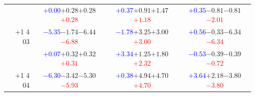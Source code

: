 \documentclass[compress]{beamer}
\begin{document}
\begin{frame}
\begin{tabular}{r | c | c | c}
          & \textcolor{blue}{$+0.00$}\hspace{0.1 cm}$+0.28$\hspace{0.1 cm}$+0.28$\hspace{0.1 cm}\textcolor{red}{$+0.28$} & \textcolor{blue}{$+0.37$}\hspace{0.1 cm}$+0.91$\hspace{0.1 cm}$+1.47$\hspace{0.1 cm}\textcolor{red}{$+1.18$} & \textcolor{blue}{$+0.35$}\hspace{0.1 cm}$-0.81$\hspace{0.1 cm}$-0.81$\hspace{0.1 cm}\textcolor{red}{$-2.01$} \\
$+$1 4 03 & \textcolor{blue}{$-5.35$}\hspace{0.1 cm}$-1.74$\hspace{0.1 cm}$-6.44$\hspace{0.1 cm}\textcolor{red}{$-6.88$} & \textcolor{blue}{$-1.78$}\hspace{0.1 cm}$+3.25$\hspace{0.1 cm}$+3.00$\hspace{0.1 cm}\textcolor{red}{$+3.00$} & \textcolor{blue}{$+0.56$}\hspace{0.1 cm}$-0.33$\hspace{0.1 cm}$-6.34$\hspace{0.1 cm}\textcolor{red}{$-6.34$} \\
          & \textcolor{blue}{$+0.07$}\hspace{0.1 cm}$+0.32$\hspace{0.1 cm}$+0.32$\hspace{0.1 cm}\textcolor{red}{$+0.31$} & \textcolor{blue}{$+3.34$}\hspace{0.1 cm}$+1.25$\hspace{0.1 cm}$+1.80$\hspace{0.1 cm}\textcolor{red}{$+2.32$} & \textcolor{blue}{$-0.53$}\hspace{0.1 cm}$-0.39$\hspace{0.1 cm}$-0.39$\hspace{0.1 cm}\textcolor{red}{$-0.72$} \\
$+$1 4 04 & \textcolor{blue}{$-6.30$}\hspace{0.1 cm}$-3.42$\hspace{0.1 cm}$-5.30$\hspace{0.1 cm}\textcolor{red}{$-5.93$} & \textcolor{blue}{$+0.38$}\hspace{0.1 cm}$+4.94$\hspace{0.1 cm}$+4.70$\hspace{0.1 cm}\textcolor{red}{$+4.70$} & \textcolor{blue}{$+3.64$}\hspace{0.1 cm}$+2.18$\hspace{0.1 cm}$-3.80$\hspace{0.1 cm}\textcolor{red}{$-3.80$} \\

\end{tabular}
\end{frame}
\end{document}
